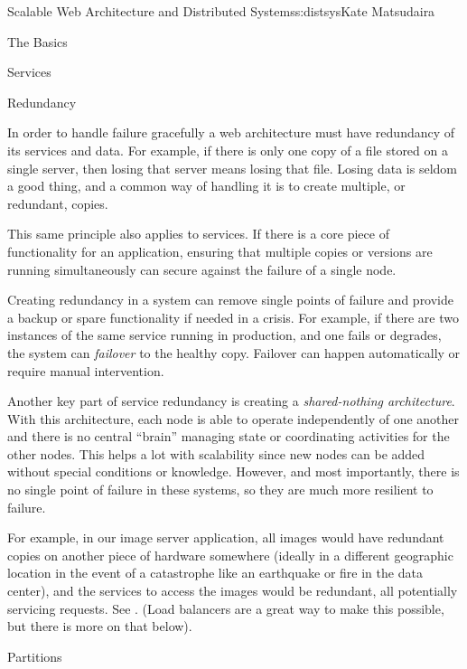 \begin{aosachapter}{Scalable Web Architecture and Distributed Systems}{s:distsys}{Kate Matsudaira}
\begin{aosasect1}{The Basics}
\begin{aosasect2}{Services}
\end{aosasect2}

\begin{aosasect2}{Redundancy}

In order to handle failure gracefully a web architecture must have
redundancy of its services and data. For example, if there is only one
copy of a file stored on a single server, then losing that server 
means losing that file. Losing data is seldom a good thing, and a
common way of handling it is to create multiple, or redundant, copies.

This same principle also applies to services. If there is a core piece
of functionality for an application, ensuring that multiple copies or
versions are running simultaneously can secure against the failure of
a single node.

Creating redundancy in a system can remove single points of failure
and provide a backup or spare functionality if needed in a crisis. For
example, if there are two instances of the same service running in
production, and one fails or degrades, the system can \emph{failover}
to the healthy copy. Failover can happen
automatically or require manual intervention.

Another key part of service redundancy is creating a \emph{shared-nothing 
architecture}. With this architecture, each node is able to
operate independently of one another and there is no central ``brain''
managing state or coordinating activities for the other nodes. This
helps a lot with scalability since new nodes can be added without
special conditions or knowledge. However, and most importantly, there
is no single point of failure in these systems, so they are much more
resilient to failure.

For example, in our image server application, all images would have
redundant copies on another piece of hardware somewhere (ideally in a
different geographic location in the event of a catastrophe like an
earthquake or fire in the data center), and the services to access the
images would be redundant, all potentially servicing requests. See 
.
(Load balancers are a great way to make this possible, but there is
more on that below).


\end{aosasect2}

\begin{aosasect2}{Partitions}


\end{aosasect2}
\end{aosasect1}
\end{aosachapter}
